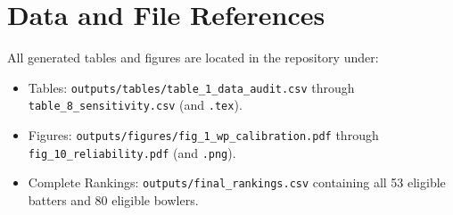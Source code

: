\documentclass[11pt,a4paper]{article}
\begin{document}
\section{Data and File References}
\label{app:references}
All generated tables and figures are located in the repository under:
\begin{itemize}
    \item Tables: \texttt{outputs/tables/table\_1\_data\_audit.csv} through \texttt{table\_8\_sensitivity.csv} (and \texttt{.tex}).
    \item Figures: \texttt{outputs/figures/fig\_1\_wp\_calibration.pdf} through \texttt{fig\_10\_reliability.pdf} (and \texttt{.png}).
    \item Complete Rankings: \texttt{outputs/final\_rankings.csv} containing all 53 eligible batters and 80 eligible bowlers.
\end{itemize}
\end{document}
